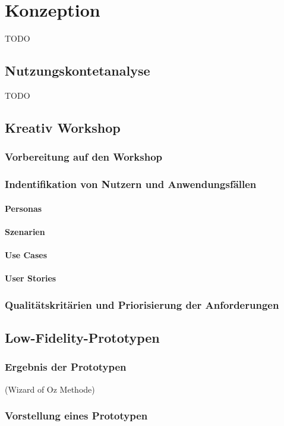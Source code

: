 \chapter{Konzeption}
TODO

\section{Nutzungskontetanalyse}
TODO

\section{Kreativ Workshop}

\subsection{Vorbereitung auf den Workshop}

\subsection{Indentifikation von Nutzern und Anwendungsfällen}

\subsubsection{Personas}

\subsubsection{Szenarien}

\subsubsection{Use Cases}

\subsubsection{User Stories}

\subsection{Qualitätskritärien und Priorisierung der Anforderungen}

\section{Low-Fidelity-Prototypen}

\subsection{Ergebnis der Prototypen}
(Wizard of Oz Methode)

\subsection{Vorstellung eines Prototypen}
